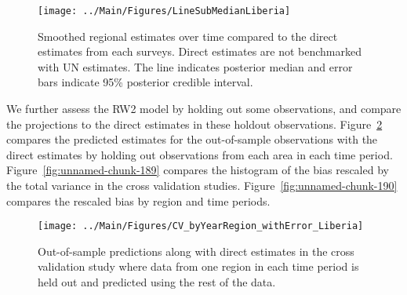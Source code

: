 \documentclass[12pt]{article}\usepackage[]{graphicx}\usepackage[]{color}
\newenvironment{knitrout}{}{} %
\begin{document}
\begin{knitrout}
\color{fgcolor}\begin{figure}[bht]

{\centering \texttt{[image: ../Main/Figures/LineSubMedianLiberia]} 

}

\caption[Smoothed regional estimates over time compared to the direct estimates from each surveys]{Smoothed regional estimates over time compared to the direct estimates from each surveys. Direct estimates are not benchmarked with UN estimates. The line indicates posterior median and error bars indicate 95\% posterior credible interval.}\label{fig:unnamed-chunk-187}
\end{figure}


\end{knitrout}
We further assess the RW2 model by holding out some observations, and compare the projections to the direct estimates in these holdout observations. Figure~\ref{fig:unnamed-chunk-188} compares the predicted estimates for the out-of-sample observations  with the direct estimates by holding out observations from each area in each time period.  Figure~\ref{fig:unnamed-chunk-189} compares the histogram of the bias rescaled by the total variance in the cross validation studies. Figure~\ref{fig:unnamed-chunk-190} compares the rescaled bias by region and time periods.



 
\begin{knitrout}
\color{fgcolor}\begin{figure}[bht]

{\centering \texttt{[image: ../Main/Figures/CV\_byYearRegion\_withError\_Liberia]} 

}

\caption[Out-of-sample predictions along with direct estimates in the cross validation study where data from one region in each time period is held out and predicted using the rest of the data]{Out-of-sample predictions along with direct estimates in the cross validation study where data from one region in each time period is held out and predicted using the rest of the data.}\label{fig:unnamed-chunk-188}
\end{figure}


\end{knitrout}
\end{document}
